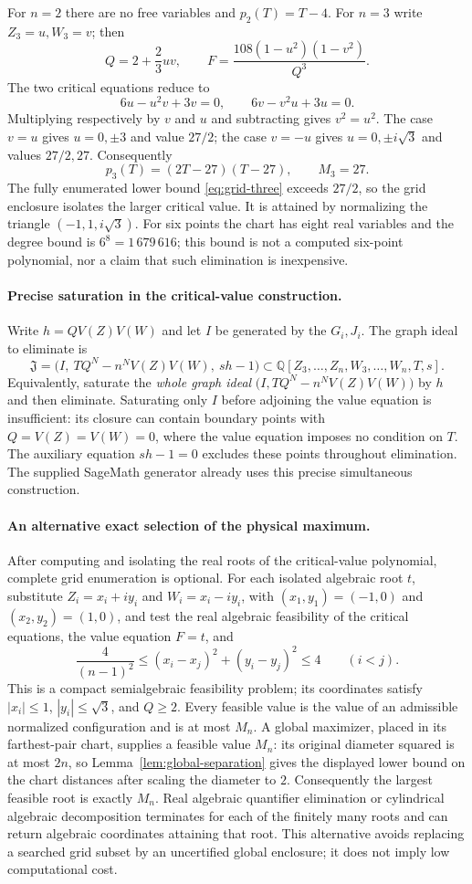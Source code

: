 \documentclass[11pt]{article}
\theoremstyle{remark}
\numberwithin{equation}{section}
\begin{document}
For $n=2$ there are no free variables and $p_2(T)=T-4$.
For $n=3$ write $Z_3=u,W_3=v$; then
\[
 Q=2+\frac23uv,\qquad
 F=\frac{108(1-u^2)(1-v^2)}{Q^3}.
\]
The two critical equations reduce to
\[
 6u-u^2v+3v=0,\qquad6v-v^2u+3u=0.
\]
Multiplying respectively by $v$ and $u$ and subtracting gives
$v^2=u^2$. The case $v=u$ gives $u=0,\pm3$ and value $27/2$;
the case $v=-u$ gives $u=0,\pm i\sqrt3$ and values $27/2,27$.
Consequently
\[
 p_3(T)=(2T-27)(T-27),\qquad M_3=27.
\]
The fully enumerated lower bound \eqref{eq:grid-three} exceeds $27/2$,
so the grid enclosure isolates the larger critical value.
It is attained by normalizing the triangle $(-1,1,i\sqrt3)$.
For six points the chart has eight real variables and the degree
bound is $6^8=1\,679\,616$; this bound is not a computed six-point
polynomial, nor a claim that such elimination is inexpensive.


\paragraph{Precise saturation in the critical-value construction.}
Write $h=QV(Z)V(W)$ and let $I$ be generated by the $G_i,J_i$.
The graph ideal to eliminate is
\[
 \mathfrak J=
 \bigl(I,\ TQ^N-n^NV(Z)V(W),\ sh-1\bigr)
 \subset\mathbb Q[Z_3,\ldots,Z_n,W_3,\ldots,W_n,T,s].
\]
Equivalently, saturate the \emph{whole graph ideal}
$\bigl(I,TQ^N-n^NV(Z)V(W)\bigr)$ by $h$ and then eliminate.
Saturating only $I$ before adjoining the value equation is insufficient:
its closure can contain boundary points with $Q=V(Z)=V(W)=0$, where
the value equation imposes no condition on $T$.  The auxiliary equation
$sh-1=0$ excludes these points throughout elimination.  The supplied
SageMath generator already uses this precise simultaneous construction.

\paragraph{An alternative exact selection of the physical maximum.}
After computing and isolating the real roots of the critical-value
polynomial, complete grid enumeration is optional.  For each isolated
algebraic root $t$, substitute
$Z_i=x_i+iy_i$ and $W_i=x_i-iy_i$, with
$(x_1,y_1)=(-1,0)$ and $(x_2,y_2)=(1,0)$, and test the real algebraic
feasibility of the critical equations, the value equation $F=t$,
and
\[
 \frac4{(n-1)^2}\le(x_i-x_j)^2+(y_i-y_j)^2\le4\qquad(i<j).
\]
This is a compact semialgebraic feasibility problem; its coordinates
satisfy $|x_i|\le1$, $|y_i|\le\sqrt3$, and $Q\ge2$.
Every feasible value is the value of an admissible normalized
configuration and is at most $M_n$.  A global maximizer, placed in
its farthest-pair chart, supplies a feasible value $M_n$: its original
diameter squared is at most $2n$, so Lemma~\ref{lem:global-separation}
gives the displayed lower bound on the chart distances after scaling
the diameter to $2$.
Consequently the largest feasible root is exactly $M_n$.
Real algebraic quantifier elimination or cylindrical algebraic
decomposition terminates for each of the finitely many roots and
can return algebraic coordinates attaining that root.
This alternative avoids replacing a searched grid subset by an
uncertified global enclosure; it does not imply low computational cost.
\end{document}

